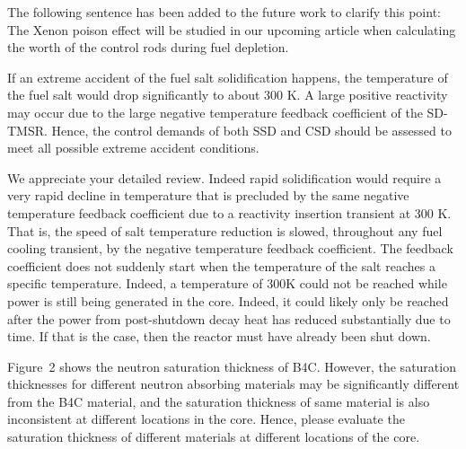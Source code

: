 \documentclass[answers,11pt]{exam}
\begin{document}
\begin{questions}
\begin{solution}
		         The following sentence has been added to the future work to clarify this point:\\
		         
		         The Xenon poison effect will be studied in our upcoming article when calculating the worth of the control rods during fuel depletion.
		          
		           
    
        \end{solution}

	
	\question If an extreme accident of the fuel salt solidification happens, the temperature of the fuel salt would drop significantly to about 300 K. A large positive reactivity may occur due to the large negative temperature feedback coefficient of the SD-TMSR. Hence, the control demands of both SSD and CSD should be assessed to meet all possible extreme accident conditions.
	\begin{solution}
		
	We appreciate your detailed review.
	Indeed rapid solidification would require a very rapid decline in temperature that is precluded by the same negative temperature feedback coefficient due to a reactivity insertion transient at 300 K. That is, the speed of salt temperature reduction is slowed, throughout any fuel cooling transient, by the negative temperature feedback coefficient. The feedback coefficient does not suddenly start when the temperature of the salt reaches a specific temperature. Indeed, a temperature of 300K could not be reached while power is still being generated in the core. Indeed, it could likely only be reached after the power from post-shutdown decay heat has reduced substantially due to time. If that is the case, then the reactor must have already been shut down.
	
	
	
	\end{solution}

	\question Figure~2 shows the neutron saturation thickness of B4C. However, the saturation thicknesses for different neutron absorbing materials may be significantly different from the B4C material, and the saturation thickness of same material is also inconsistent at different locations in the core. Hence, please evaluate the saturation thickness of different materials at different locations of the core.
\begin{solution}
	

\end{solution}
\end{questions}
\end{document}

